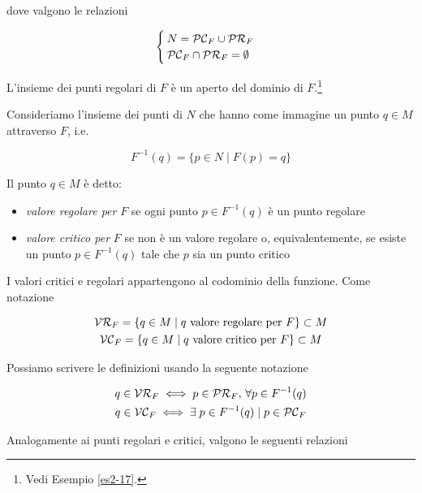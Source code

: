 dove valgono le relazioni

\begin{equation}
	\begin{cases}
		N = \mathcal{PC}_{F} \cup \mathcal{PR}_{F}\\
		\mathcal{PC}_{F} \cap \mathcal{PR}_{F} = \emptyset
	\end{cases}
\end{equation}

\begin{remark}
	L'insieme dei punti regolari di $ F $ è un aperto del dominio di $ F $.\footnote{%
		Vedi Esempio \ref{es2-17}.%
	}
\end{remark}

Consideriamo l'insieme dei punti di $ N $ che hanno come immagine un punto $ q \in M $ attraverso $ F $, i.e.

\begin{equation}
	F^{-1}(q) = \{ p \in N \mid F(p) = q \}
\end{equation}

Il punto $ q \in M $ è detto:

\begin{itemize}
	\item \textit{valore regolare per} $ F $ se ogni punto $ p \in F^{-1}(q) $ è un punto regolare
	
	\item \textit{valore critico per} $ F $ se non è un valore regolare o, equivalentemente, se esiste un punto $ p \in F^{-1}(q) $ tale che $ p $ sia un punto critico
\end{itemize}

I valori critici e regolari appartengono al codominio della funzione. Come notazione

\begin{gather}
	\mathcal{VR}_{F} = \{ q \in M \mid q \text{ valore regolare per } F \} \subset M\\
	\mathcal{VC}_{F} = \{ q \in M \mid q \text{ valore critico per } F \} \subset M
\end{gather}

Possiamo scrivere le definizioni usando la seguente notazione

\begin{gather}
	q \in \mathcal{VR}_{F} \iff p \in \mathcal{PR}_{F}, \, \forall p \in F^{-1}(q)\\
	q \in \mathcal{VC}_{F} \iff \exists \; p \in F^{-1}(q) \mid p \in \mathcal{PC}_{F}
\end{gather}

Analogamente ai punti regolari e critici, valgono le seguenti relazioni

